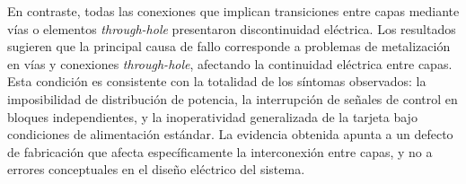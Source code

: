 \documentclass[journal,trans]{IEEEtran}
\begin{document}
En contraste, todas las conexiones que implican transiciones entre capas mediante vías o
elementos \textit{through-hole} presentaron discontinuidad eléctrica. Los resultados sugieren que la principal causa de fallo corresponde a
problemas de metalización en vías y conexiones \textit{through-hole}, afectando la
continuidad eléctrica entre capas. Esta condición es consistente con la totalidad de los
síntomas observados: la imposibilidad de distribución de potencia, la interrupción de
señales de control en bloques independientes, y la inoperatividad generalizada de la
tarjeta bajo condiciones de alimentación estándar. La evidencia obtenida apunta a un
defecto de fabricación que afecta específicamente la interconexión entre capas, y no a
errores conceptuales en el diseño eléctrico del sistema.

\end{document}
